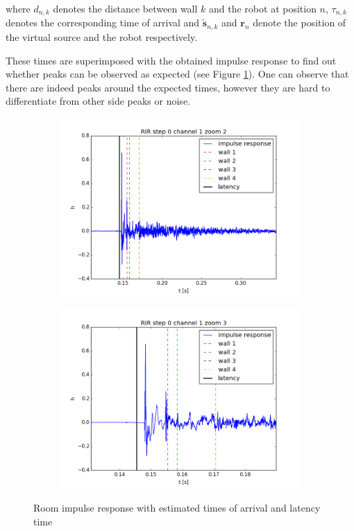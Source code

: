 where $d_{n,k}$ denotes the distance between wall $k$ and the robot at position $n$, $\tau_{n,k}$ denotes the corresponding time of arrival and $\tilde{\mathbf{s}}_{n,k}$ and $\mathbf{r}_{n}$ denote the position of the virtual source and the robot respectively. 

These times are superimposed with the obtained impulse response to find out whether peaks can be observed as expected (see Figure \ref{fig:RIR_zooms}).
One can observe that there are indeed peaks around the expected times, however they are hard to differentiate from other side peaks or noise.

\begin{figure}[H]
	\centering		
	\begin{subfigure}[b]{0.49\linewidth}
        \centering
		\includegraphics[width=\linewidth]{files/0_1_RIR_zoom2.png}
	\end{subfigure} 
	\begin{subfigure}[b]{0.49\linewidth}
        \centering
		\includegraphics[width=\linewidth]{files/0_1_RIR_zoom3.png}
	\end{subfigure}
	\caption{Room impulse response with estimated times of arrival and latency time} 
	\label{fig:RIR_zooms}
\end{figure}

